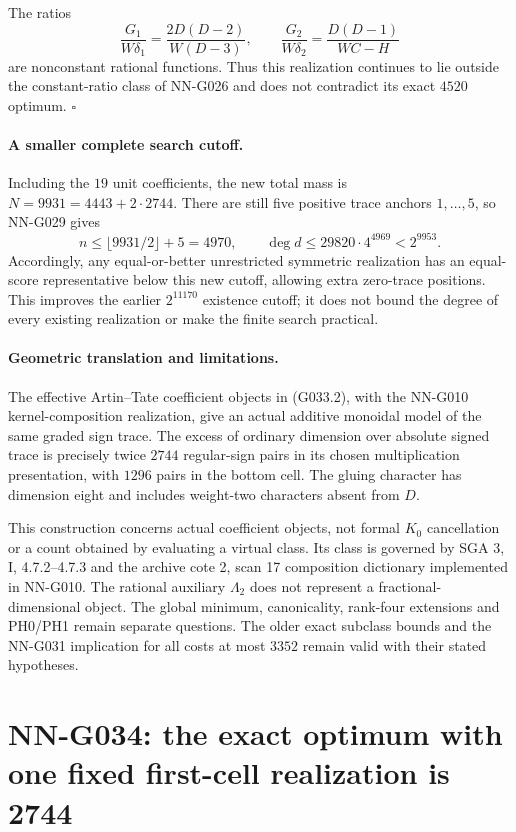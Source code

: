 The ratios
\[
 \frac{G_1}{W\delta_1}
   =\frac{2D(D-2)}{W(D-3)},\qquad
 \frac{G_2}{W\delta_2}=\frac{D(D-1)}{WC-H}
\]
are nonconstant rational functions. Thus this realization
continues to lie outside the constant-ratio class of
NN-G026 and does not contradict its exact $4520$ optimum.
\hfill$\square$

\paragraph{A smaller complete search cutoff.}
Including the $19$ unit coefficients, the new total mass
is $N=9931=4443+2\cdot2744$. There are still five positive
trace anchors $1,\ldots,5$, so NN-G029 gives
\[
 n\le\lfloor9931/2\rfloor+5=4970,\qquad
 \deg d\le29820\cdot4^{4969}<2^{9953}.              \tag{G033.4}
\]
Accordingly, any equal-or-better unrestricted symmetric
realization has an equal-score representative below
this new cutoff, allowing extra zero-trace positions.
This improves the earlier $2^{11170}$ existence cutoff;
it does not bound the degree of every existing realization
or make the finite search practical.

\paragraph{Geometric translation and limitations.}
The effective Artin--Tate coefficient objects in
(G033.2), with the NN-G010 kernel-composition realization,
give an actual additive monoidal model of the same
graded sign trace. The excess of ordinary dimension
over absolute signed trace is precisely twice $2744$
regular-sign pairs in its chosen multiplication
presentation, with $1296$ pairs in the bottom cell.
The gluing character has dimension eight and includes
weight-two characters absent from $D$.

This construction concerns actual coefficient objects,
not formal $K_0$ cancellation or a count obtained by
evaluating a virtual class. Its class is governed by
SGA 3, I, 4.7.2--4.7.3 and the archive cote 2, scan 17
composition dictionary implemented in NN-G010.
The rational auxiliary $\Lambda_2$ does not represent
a fractional-dimensional object. The global minimum,
canonicality, rank-four extensions and PH0/PH1 remain
separate questions. The older exact subclass bounds
and the NN-G031 implication for all costs at most
$3352$ remain valid with their stated hypotheses.




\section{NN-G034: the exact optimum with one fixed first-cell realization is 2744}
